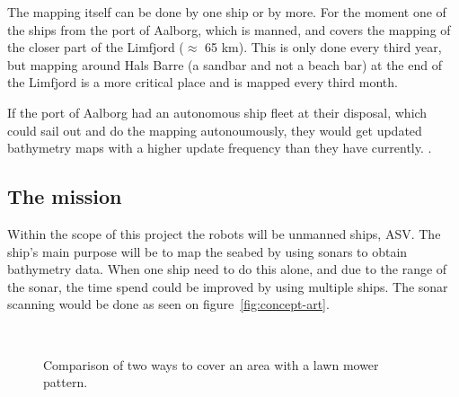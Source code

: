 The mapping itself can be done by one ship or by more. For the moment one of the ships from the port of Aalborg, which is manned, and covers the mapping of the closer part of the Limfjord ($\approx$ 65 km). This is only done every third year, but mapping around Hals Barre (a sandbar and not a beach bar) at the end of the Limfjord is a more critical place and is mapped every third month.

If the port of Aalborg had an autonomous ship fleet at their disposal, which could sail out and do the mapping autonoumously, they would get updated bathymetry maps with a higher update frequency than they have currently.  \cite{portofaalborg}.

\subsection{The mission}
Within the scope of this project the robots will be unmanned ships,
\ac{ASV}. The ship's main purpose will be to map the seabed by using
sonars to obtain bathymetry data. When one ship need to do this alone, and due to the range of
the sonar, the time spend could be improved by using multiple ships. The sonar scanning would
be done as seen on figure~\vref{fig:concept-art}.

\begin{figure}[htbp]
	\centering
	\ %
	\caption{Comparison of two ways to cover an area with a lawn mower
	pattern.}
	\label{fig:concept-art}
\end{figure}

